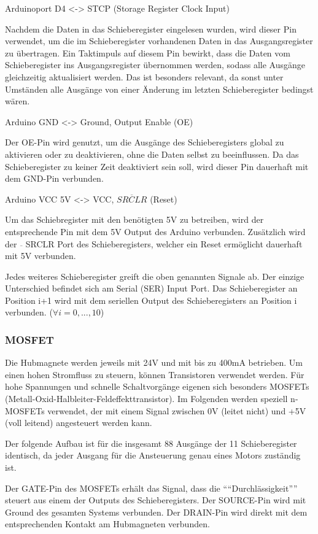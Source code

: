 Arduinoport D4 <-> STCP (Storage Register Clock Input)

Nachdem die Daten in das Schieberegister eingelesen wurden, wird dieser Pin verwendet, um die im Schieberegister vorhandenen Daten in das Ausgangsregister zu übertragen.
Ein Taktimpuls auf diesem Pin bewirkt, dass die Daten vom Schieberegister ins Ausgangsregister übernommen werden, sodass alle Ausgänge gleichzeitig aktualisiert werden.
Das ist besonders relevant, da sonst unter Umständen alle Ausgänge von einer Änderung im letzten Schieberegister bedingst wären.

Arduino GND <-> Ground, Output Enable (OE)

Der OE-Pin wird genutzt, um die Ausgänge des Schieberegisters global zu aktivieren oder zu deaktivieren, ohne die Daten selbst zu beeinflussen.
Da das Schieberegister zu keiner Zeit deaktiviert sein soll, wird dieser Pin dauerhaft mit dem GND-Pin verbunden.

Arduino VCC 5V <-> VCC, $\overline{SRCLR}$ (Reset)

Um das Schiebregister mit den benötigten 5V zu betreiben, wird der entsprechende Pin mit dem 5V Output des Arduino verbunden.
Zusätzlich wird der $\overline{ }$ SRCLR Port des Schieberegisters, welcher ein Reset ermöglicht dauerhaft mit 5V verbunden.

Jedes weiteres Schieberegister greift die oben genannten Signale ab.
Der einzige Unterschied befindet sich am Serial (SER) Input Port.
Das Schieberegister an Position i+1 wird mit dem seriellen Output des Schieberegisters an Position i verbunden. ($\forall i = 0,...,10$)

\subsubsection{MOSFET}

Die Hubmagnete werden jeweils mit 24V und mit bis zu 400mA betrieben.
Um einen hohen Stromfluss zu steuern, können Transistoren verwendet werden.
Für hohe Spannungen und schnelle Schaltvorgänge eigenen sich besonders MOSFETs (Metall-Oxid-Halbleiter-Feldeffekttransistor).
Im Folgenden werden speziell n-MOSFETs verwendet, der mit einem Signal zwischen 0V (leitet nicht) und +5V (voll leitend) angesteuert werden kann.

Der folgende Aufbau ist für die insgesamt 88 Ausgänge der 11 Schieberegister identisch, da jeder Ausgang für die Ansteuerung genau eines Motors zuständig ist.

Der GATE-Pin des MOSFETs erhält das Signal, dass die \enquote{``Durchlässigkeit''} steuert aus einem der Outputs des Schieberegisters.
Der SOURCE-Pin wird mit Ground des gesamten Systems verbunden.
Der DRAIN-Pin wird direkt mit dem entsprechenden Kontakt am Hubmagneten verbunden.

